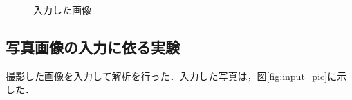 \documentclass{jarticle}
\begin{document}
\begin{figure}[H]
{		\label{fig:sample4}}
	\caption{入力した画像}
	\label{fig:input}
\end{figure}


\subsection{写真画像の入力に依る実験}
撮影した画像を入力して解析を行った．入力した写真は，図\ref{fig:input_pic}に示した．
\end{document}
